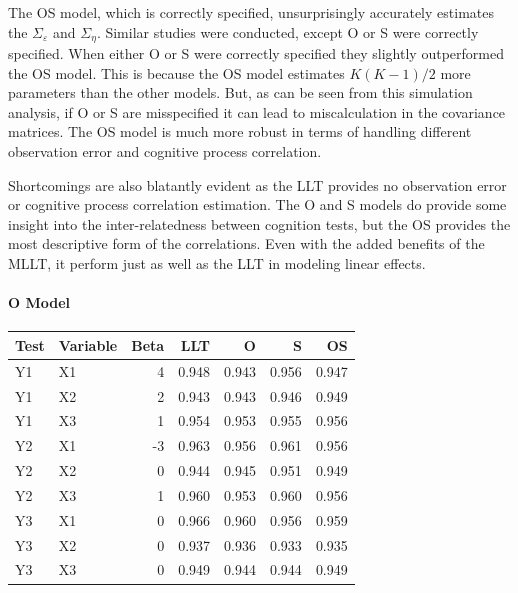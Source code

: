 \documentclass[
]{article}
\begin{document}
The OS model, which is correctly specified, unsurprisingly accurately estimates the \(\Sigma_\varepsilon\) and \(\Sigma_\eta\). Similar studies were conducted, except O or S were correctly specified. When either O or S were correctly specified they slightly outperformed the OS model. This is because the OS model estimates \(K(K-1)/2\) more parameters than the other models. But, as can be seen from this simulation analysis, if O or S are misspecified it can lead to miscalculation in the covariance matrices. The OS model is much more robust in terms of handling different observation error and cognitive process correlation.

Shortcomings are also blatantly evident as the LLT provides no observation error or cognitive process correlation estimation. The O and S models do provide some insight into the inter-relatedness between cognition tests, but the OS provides the most descriptive form of the correlations. Even with the added benefits of the MLLT, it perform just as well as the LLT in modeling linear effects.

\hypertarget{o-model-1}{%
\paragraph{O Model}\label{o-model-1}}

\begin{longtable}[t]{l|l|r|r|r|r|r}
\hline
Test & Variable & Beta & LLT & O & S & OS\\
\hline
Y1 & X1 & 4 & 0.948 & 0.943 & 0.956 & 0.947\\
\hline
Y1 & X2 & 2 & 0.943 & 0.943 & 0.946 & 0.949\\
\hline
Y1 & X3 & 1 & 0.954 & 0.953 & 0.955 & 0.956\\
\hline
Y2 & X1 & -3 & 0.963 & 0.956 & 0.961 & 0.956\\
\hline
Y2 & X2 & 0 & 0.944 & 0.945 & 0.951 & 0.949\\
\hline
Y2 & X3 & 1 & 0.960 & 0.953 & 0.960 & 0.956\\
\hline
Y3 & X1 & 0 & 0.966 & 0.960 & 0.956 & 0.959\\
\hline
Y3 & X2 & 0 & 0.937 & 0.936 & 0.933 & 0.935\\
\hline
Y3 & X3 & 0 & 0.949 & 0.944 & 0.944 & 0.949\\
\hline
\end{longtable}
\end{document}
